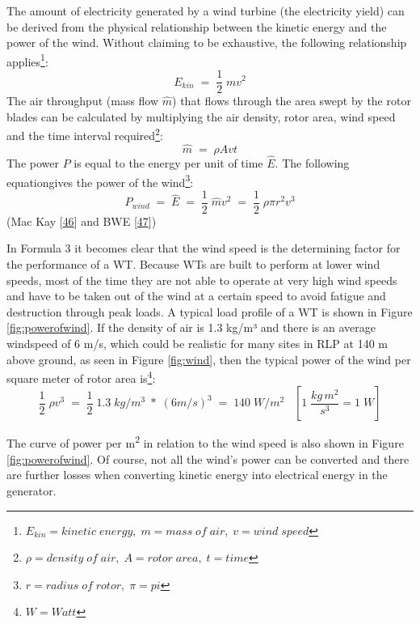 \documentclass[a4paper,11pt]{article}
\begin{document}
The amount of electricity generated by a wind turbine (the electricity yield) can be derived from the physical relationship between the kinetic energy and the power of the wind. Without claiming to be exhaustive, the following relationship applies\footnote{\(E_{kin}= kinetic\; energy,\; m=mass\; of\; air,\; v= wind\;speed\)}:
\begin{equation}
E_{kin}\; =\; \frac{1}{2}\;mv^2
\end{equation}
The air throughput (mass flow \(\hat{m}\)) that flows through the area swept by the rotor blades can be calculated by multiplying the air density, rotor area, wind speed and the time interval required\footnote{\(\rho= density\; of\; air,\; A= rotor\; area,\; t=time\)}:
\begin{equation}
\hat{m}\;=\;\rho A vt
\end{equation}
The power \(P\) is equal to the energy per unit of time \(\hat{E}\). The following equationgives the power of the wind\footnote{\(r= radius\; of\; rotor, \; \pi=pi\)}:
\begin{equation}
P_{wind}\;=\;\hat{E}\;=\;\frac{1}{2}\;\hat{m}v^2\;=\;\frac{1}{2}\; \rho \pi r^2 v^3
\end{equation}
(Mac Kay {[}\protect\hyperlink{ref-DavidJCMacKay.2009}{46}{]} and BWE {[}\protect\hyperlink{ref-BWE.2021}{47}{]})

In Formula 3 it becomes clear that the wind speed is the determining factor for the performance of a WT. Because WTs are built to perform at lower wind speeds, most of the time they are not able to operate at very high wind speeds and have to be taken out of the wind at a certain speed to avoid fatigue and destruction through peak loads. A typical load profile of a WT is shown in Figure \ref{fig:powerofwind}. If the density of air is 1.3 kg/m³ and there is an average windspeed of 6 m/s, which could be realistic for many sites in RLP at 140 m above ground, as seen in Figure \ref{fig:wind}, then the typical power of the wind per square meter of rotor area is\footnote{\(W= Watt\)}:
\begin{equation}
\frac{1}{2}\; \rho v^3\;=\;\frac{1}{2}\;1.3\;kg/m^3\; *\; (6 m/s)^3\;=\;140\; W/m^2\;\;\; [1\; \frac{kg\, m^2}{s^3} = 1\; W]
\end{equation}
\newpage

The curve of power per m\textsuperscript{2} in relation to the wind speed is also shown in Figure \ref{fig:powerofwind}. Of course, not all the wind's power can be converted and there are further losses when converting kinetic energy into electrical energy in the generator.
\end{document}
